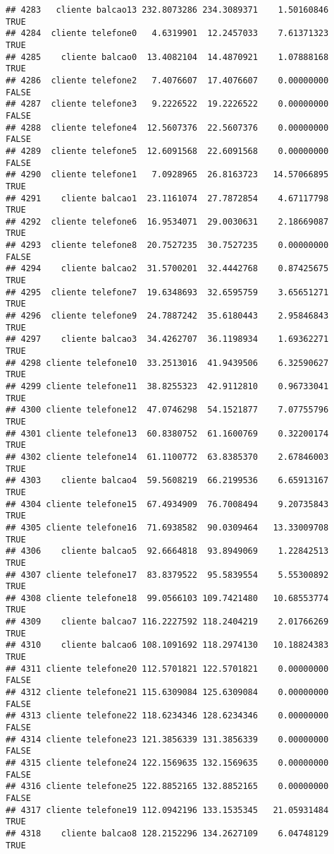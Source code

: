 \documentclass[
]{article}
\begin{document}
\begin{verbatim}
## 4283   cliente balcao13 232.8073286 234.3089371    1.50160846     TRUE
## 4284  cliente telefone0   4.6319901  12.2457033    7.61371323     TRUE
## 4285    cliente balcao0  13.4082104  14.4870921    1.07888168     TRUE
## 4286  cliente telefone2   7.4076607  17.4076607    0.00000000    FALSE
## 4287  cliente telefone3   9.2226522  19.2226522    0.00000000    FALSE
## 4288  cliente telefone4  12.5607376  22.5607376    0.00000000    FALSE
## 4289  cliente telefone5  12.6091568  22.6091568    0.00000000    FALSE
## 4290  cliente telefone1   7.0928965  26.8163723   14.57066895     TRUE
## 4291    cliente balcao1  23.1161074  27.7872854    4.67117798     TRUE
## 4292  cliente telefone6  16.9534071  29.0030631    2.18669087     TRUE
## 4293  cliente telefone8  20.7527235  30.7527235    0.00000000    FALSE
## 4294    cliente balcao2  31.5700201  32.4442768    0.87425675     TRUE
## 4295  cliente telefone7  19.6348693  32.6595759    3.65651271     TRUE
## 4296  cliente telefone9  24.7887242  35.6180443    2.95846843     TRUE
## 4297    cliente balcao3  34.4262707  36.1198934    1.69362271     TRUE
## 4298 cliente telefone10  33.2513016  41.9439506    6.32590627     TRUE
## 4299 cliente telefone11  38.8255323  42.9112810    0.96733041     TRUE
## 4300 cliente telefone12  47.0746298  54.1521877    7.07755796     TRUE
## 4301 cliente telefone13  60.8380752  61.1600769    0.32200174     TRUE
## 4302 cliente telefone14  61.1100772  63.8385370    2.67846003     TRUE
## 4303    cliente balcao4  59.5608219  66.2199536    6.65913167     TRUE
## 4304 cliente telefone15  67.4934909  76.7008494    9.20735843     TRUE
## 4305 cliente telefone16  71.6938582  90.0309464   13.33009708     TRUE
## 4306    cliente balcao5  92.6664818  93.8949069    1.22842513     TRUE
## 4307 cliente telefone17  83.8379522  95.5839554    5.55300892     TRUE
## 4308 cliente telefone18  99.0566103 109.7421480   10.68553774     TRUE
## 4309    cliente balcao7 116.2227592 118.2404219    2.01766269     TRUE
## 4310    cliente balcao6 108.1091692 118.2974130   10.18824383     TRUE
## 4311 cliente telefone20 112.5701821 122.5701821    0.00000000    FALSE
## 4312 cliente telefone21 115.6309084 125.6309084    0.00000000    FALSE
## 4313 cliente telefone22 118.6234346 128.6234346    0.00000000    FALSE
## 4314 cliente telefone23 121.3856339 131.3856339    0.00000000    FALSE
## 4315 cliente telefone24 122.1569635 132.1569635    0.00000000    FALSE
## 4316 cliente telefone25 122.8852165 132.8852165    0.00000000    FALSE
## 4317 cliente telefone19 112.0942196 133.1535345   21.05931484     TRUE
## 4318    cliente balcao8 128.2152296 134.2627109    6.04748129     TRUE

\end{verbatim}
\end{document}
